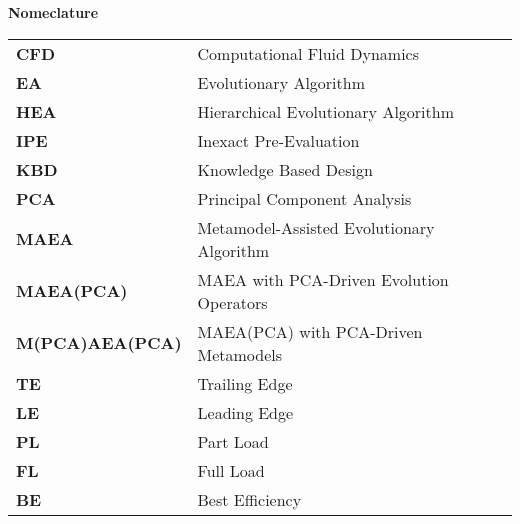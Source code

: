 \thispagestyle{empty}
%
%
%
{\bf Nomeclature}
\begin{table}[h!]
\begin{tabular}{ ll }
\textbf{CFD} & Computational Fluid Dynamics\\
\textbf{EA} & Evolutionary Algorithm \\
\textbf{HEA} & Hierarchical Evolutionary Algorithm \\
\textbf{IPE} & Inexact Pre-Evaluation \\
\textbf{KBD} & Knowledge Based Design\\
\textbf{PCA} & Principal Component Analysis\\
\textbf{MAEA} & Metamodel-Assisted Evolutionary Algorithm \\
\textbf{MAEA(PCA)} & MAEA with PCA-Driven Evolution Operators\\
\textbf{M(PCA)AEA(PCA)} & MAEA(PCA) with PCA-Driven Metamodels\\
\textbf{TE}       & Trailing Edge\\
\textbf{LE}       & Leading Edge\\
\textbf{PL}       & Part Load\\
\textbf{FL}       & Full Load\\
\textbf{BE}       & Best Efficiency\\
\end{tabular}
\end{table}
